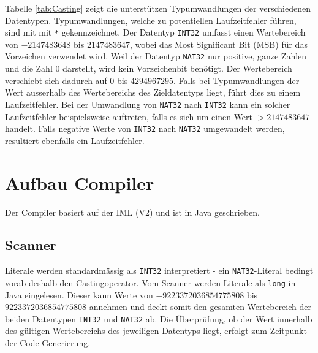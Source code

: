 \documentclass[10pt, a4paper, twocolumn]{article} %
\begin{document}
Tabelle \ref{tab:Casting} zeigt die unterstützen Typumwandlungen der verschiedenen Datentypen.
Typumwandlungen, welche zu potentiellen Laufzeitfehler führen, sind mit mit \texttt{*} gekennzeichnet.
Der Datentyp \texttt{INT32} umfasst einen Wertebereich von $-2147483648$ bis $2147483647$, wobei das Most Significant Bit (MSB) für das Vorzeichen verwendet wird.
Weil der Datentyp \texttt{NAT32} nur positive, ganze Zahlen und die Zahl 0 darstellt, wird kein Vorzeichenbit benötigt.
Der Wertebereich verschiebt sich dadurch auf $0$ bis $4294967295$.
Falls bei Typumwandlungen der Wert ausserhalb des Wertebereichs des Zieldatentyps liegt, führt dies zu einem Laufzeitfehler.
Bei der Umwandlung von \texttt{NAT32} nach \texttt{INT32} kann ein solcher Laufzeitfehler beispielsweise auftreten, falls es sich um einen Wert $> 2147483647$ handelt.
Falls negative Werte von \texttt{INT32} nach \texttt{NAT32} umgewandelt werden, resultiert ebenfalls ein Laufzeitfehler.
\begin{table}[h]
    \tiny
    \centering
    \caption{Casting zwischen Datentypen}
    \label{tab:Casting}
\end{table}

\section{Aufbau Compiler}
Der Compiler basiert auf der IML (V2) und ist in Java geschrieben.

\subsection{Scanner}
Literale werden standardmässig als \texttt{INT32} interpretiert - ein \texttt{NAT32}-Literal bedingt vorab deshalb den Castingoperator.
Vom Scanner werden Literale als \texttt{long} in Java eingelesen.
Dieser kann Werte von $-9223372036854775808$ bis $9223372036854775808$ annehmen und deckt somit den gesamten Wertebereich der beiden Datentypen \texttt{INT32} und \texttt{NAT32} ab.
Die Überprüfung, ob der Wert innerhalb des gültigen Wertebereichs des jeweiligen Datentyps liegt, erfolgt zum Zeitpunkt der Code-Generierung.
\end{document}

